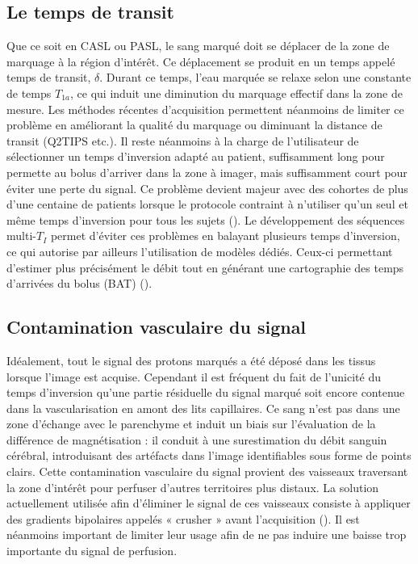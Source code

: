 \subsection{Le temps de transit}
Que ce soit en CASL ou PASL, le sang marqué doit se déplacer de la zone de marquage à la
région d’intérêt. Ce déplacement se produit en un temps appelé temps de transit, $\delta$. Durant ce temps,
l’eau marquée se relaxe selon une constante de temps $T_{1a}$, ce qui induit une diminution du marquage
effectif dans la zone de mesure. Les méthodes récentes d’acquisition permettent néanmoins de limiter
ce problème en améliorant la qualité du marquage ou diminuant la distance de transit (Q2TIPS etc.). Il
reste néanmoins à la charge de l’utilisateur de sélectionner un temps d’inversion adapté au patient,
suffisamment long pour permette au bolus d’arriver dans la zone à imager, mais suffisamment court
pour éviter une perte du signal. Ce problème devient majeur avec des cohortes de plus d’une centaine
de patients lorsque le protocole contraint à n’utiliser qu’un seul et même temps d’inversion pour tous
les sujets (\cite{Deverdun2015}). Le développement des séquences multi-$T_I$ permet d’éviter ces problèmes en balayant
plusieurs temps d’inversion, ce qui autorise par ailleurs l’utilisation de modèles dédiés. Ceux-ci
permettant d’estimer plus précisément le débit tout en générant une cartographie des temps
d’arrivées du bolus (BAT) (\cite{Chappell2009}).
\subsection{Contamination vasculaire du signal}
Idéalement, tout le signal des protons marqués a été déposé dans les tissus lorsque l’image est
acquise. Cependant il est fréquent du fait de l’unicité du temps d’inversion qu’une partie résiduelle du
signal marqué soit encore contenue dans la vascularisation en amont des lits capillaires. Ce sang n’est
pas dans une zone d’échange avec le parenchyme et induit un biais sur l’évaluation de la différence de
magnétisation : il conduit à une surestimation du débit sanguin cérébral, introduisant des artéfacts
dans l’image identifiables sous forme de points clairs. Cette contamination vasculaire du signal
provient des vaisseaux traversant la zone d’intérêt pour perfuser d’autres territoires plus distaux. La
solution actuellement utilisée afin d’éliminer le signal de ces vaisseaux consiste à appliquer des
gradients bipolaires appelés « crusher » avant l’acquisition (\cite{Ye1997}). Il est néanmoins important de limiter
leur usage afin de ne pas induire une baisse trop importante du signal de perfusion.\\
